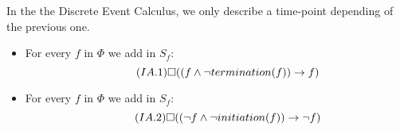 In the the Discrete Event Calculus, we only describe a time-point depending of the previous one.

\begin{itemize}
  \item
    For every $f$ in $\Phi$ we add in $S_f$:
    \begin{equation}\tag{$IA.1$}
      \square((f \land \neg termination(f)) \rightarrow f)
    \end{equation}
  \item
    For every $f$ in $\Phi$ we add in $S_f$:
    \begin{equation}\tag{$IA.2$}
      \square((\neg f \land \neg initiation(f)) \rightarrow \neg f)
    \end{equation}
\end{itemize}

